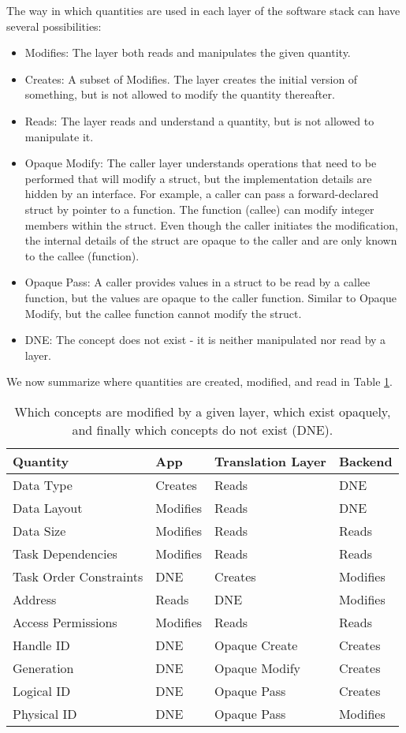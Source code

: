 The way in which quantities are used in each layer of the software stack can have several possibilities:
\begin{itemize}
\item Modifies: The layer both reads and manipulates the given quantity.
\item Creates: A subset of Modifies. The layer creates the initial version of something, but is not allowed to modify the quantity thereafter.
\item Reads: The layer reads and understand a quantity, but is not allowed to manipulate it.
\item Opaque Modify: The caller layer understands operations that need to be performed that will modify a struct, but the implementation details are hidden by an interface. 
For example, a caller can pass a forward-declared struct by pointer to a function. 
The function (callee) can modify integer members within the struct. 
Even though the caller initiates the modification, the internal details of the struct are opaque to the caller and are only known to the callee (function).
\item Opaque Pass: A caller provides values in a struct to be read by a callee function, but the values are opaque to the caller function. 
Similar to Opaque Modify, but the callee function cannot modify the struct.
\item DNE: The concept does not exist - it is neither manipulated nor read by a layer.
\end{itemize}
We now summarize where quantities are created, modified, and read in Table \ref{tbl:conceptsInLayers}.

\begin{table}
\begin{tabular}{l l l l}
\hline
Quantity & App & Translation Layer & Backend \\
\hline
Data Type & Creates & Reads & DNE \\
Data Layout & Modifies & Reads & DNE \\
Data Size & Modifies & Reads & Reads \\
Task Dependencies & Modifies & Reads & Reads \\
Task Order Constraints & DNE & Creates & Modifies \\
Address & Reads & DNE & Modifies \\
Access Permissions & Modifies & Reads & Reads \\
Handle ID & DNE & Opaque Create & Creates \\
Generation & DNE & Opaque Modify & Creates \\
Logical ID & DNE & Opaque Pass & Creates \\
Physical ID & DNE & Opaque Pass & Modifies 
\end{tabular}
\caption{Which concepts are modified by a given layer, which exist opaquely, and finally which concepts do not exist (DNE).}
\label{tbl:conceptsInLayers}
\end{table}

